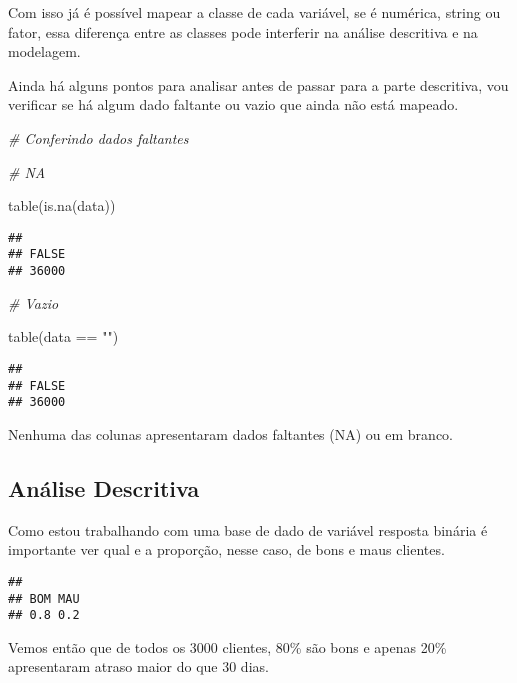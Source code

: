 \documentclass[
]{book}
\newenvironment{Shaded}{\begin{snugshade}}{\end{snugshade}}
\newcommand{\CommentTok}[1]{\textcolor[rgb]{0.56,0.35,0.01}{\textit{#1}}}
\newcommand{\FunctionTok}[1]{\textcolor[rgb]{0.00,0.00,0.00}{#1}}
\newcommand{\NormalTok}[1]{#1}
\newcommand{\SpecialCharTok}[1]{\textcolor[rgb]{0.00,0.00,0.00}{#1}}
\newcommand{\StringTok}[1]{\textcolor[rgb]{0.31,0.60,0.02}{#1}}
\begin{document}
Com isso já é possível mapear a classe de cada variável, se é numérica, string ou fator, essa diferença entre as classes pode interferir na análise descritiva e na modelagem.

Ainda há alguns pontos para analisar antes de passar para a parte descritiva, vou verificar se há algum dado faltante ou vazio que ainda não está mapeado.

\begin{Shaded}
\begin{Highlighting}[]
\CommentTok{\# Conferindo dados faltantes}

\CommentTok{\# NA}

\FunctionTok{table}\NormalTok{(}\FunctionTok{is.na}\NormalTok{(data))}
\end{Highlighting}
\end{Shaded}

\begin{verbatim}
## 
## FALSE 
## 36000
\end{verbatim}

\begin{Shaded}
\begin{Highlighting}[]
\CommentTok{\# Vazio}

\FunctionTok{table}\NormalTok{(data }\SpecialCharTok{==} \StringTok{""}\NormalTok{)}
\end{Highlighting}
\end{Shaded}

\begin{verbatim}
## 
## FALSE 
## 36000
\end{verbatim}

Nenhuma das colunas apresentaram dados faltantes (NA) ou em branco.

\hypertarget{anuxe1lise-descritiva-1}{%
\subsection{Análise Descritiva}\label{anuxe1lise-descritiva-1}}

Como estou trabalhando com uma base de dado de variável resposta binária é importante ver qual e a proporção, nesse caso, de bons e maus clientes.

\begin{Shaded}
\end{Shaded}

\begin{verbatim}
## 
## BOM MAU 
## 0.8 0.2
\end{verbatim}

Vemos então que de todos os 3000 clientes, 80\% são bons e apenas 20\% apresentaram atraso maior do que 30 dias.

  
\end{document}
